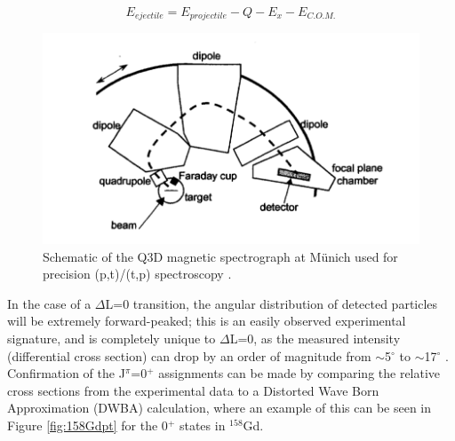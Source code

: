 \begin{equation}\label{eq:Q3D_E}
E_{ejectile}=E_{projectile}-Q-E_x-E_{C.O.M.}
\end{equation}

\begin{figure}[ht]
\begin{center}
\includegraphics[width=\textwidth]{figures/Q3D_spectrometer.png}
\caption{Schematic of the Q3D magnetic spectrograph at M\"{u}nich used for precision (p,t)/(t,p) spectroscopy \cite{Meyer_thesis}.}
\label{fig:Q3D}
\end{center}
\end{figure}


In the case of a $\Delta$L=0 transition, the angular distribution of detected particles will be extremely forward-peaked; this is an easily observed experimental signature, and is completely unique to $\Delta$L=0, as the measured intensity (differential cross section) can drop by an order of magnitude from $\sim$5$^\circ$ to $\sim$17$^\circ$ \cite{Meyer_pt0_2006}. Confirmation of the J$^\pi$=0$^+$ assignments can be made by comparing the relative cross sections from the experimental data to a Distorted Wave Born Approximation (DWBA) calculation, where an example of this can be seen in Figure \ref{fig:158Gdpt} for the 0$^+$ states in $^{158}$Gd.

